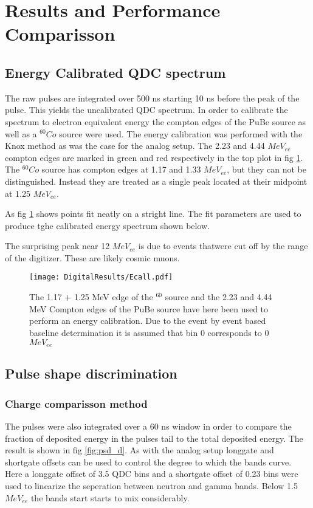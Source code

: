 \documentclass[main.tex]{subfiles}
\begin{document}
\section{Results and Performance Comparisson}
\subsection{Energy Calibrated QDC spectrum}
The raw pulses are integrated over 500 ns starting 10 ns before the peak of the pulse. This yields the uncalibrated QDC spectrum. In order to calibrate the spectrum to electron equivalent energy the compton edges of the PuBe source as well as a $^{60}Co$ source were used. The energy calibration was performed with the Knox method as was the case for the analog setup. The 2.23 and 4.44 $MeV_{ee}$ compton edges are marked in green and red respectively in the top plot in fig \ref{fig:D_QDC}. The $^{60}Co$ source has compton edges at 1.17 and 1.33 $MeV_{ee}$, but they can not be distinguished. Instead they are treated as a single peak located at their midpoint at 1.25 $MeV_{ee}$. 

As fig \ref{fig:D_QDC} shows points fit neatly on a stright line. The fit parameters are used to produce tghe calibrated energy spectrum shown below.

The surprising peak near 12 $MeV_{ee}$ is due to events thatwere cut off by the range of the digitizer. These are likely cosmic muons.
\begin{figure}[h]
    \centering
        \texttt{[image: DigitalResults/Ecall.pdf]}
        \caption{The 1.17 + 1.25 MeV edge of the $^60$ source and the 2.23 and 4.44 MeV Compton edges of the PuBe source have here been used to perform an energy calibration. Due to the event by event based baseline determination it is assumed that bin 0 corresponds to 0 $MeV_{ee}$}
    \label{fig:D_QDC}
\end{figure}



\subsection{Pulse shape discrimination}
\subsubsection{Charge comparisson method}
The pulses were also integrated over a 60 ns window in order to compare the fraction of deposited energy in the pulses tail to the total deposited energy. The result is shown in fig \ref{fig:psd_d}. As with the analog setup longgate and shortgate offsets can be used to control the degree to which the bands curve. Here a longgate offset of 3.5 QDC bins and a shortgate offset of 0.23 bins were used to linearize the seperation between neutron and gamma bands. Below 1.5 $MeV_{ee}$ the bands start starts to mix considerably.
\end{document}
